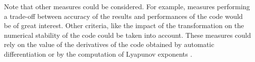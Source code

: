 \documentclass[main.tex]{subfiles}
\begin{document}
Note that other measures could be considered. For example, measures performing a trade-off between accuracy of the
results and performances of the code would be of great interest. Other criteria, like the impact of the transformation
on the numerical stability of the code could be taken into account. These measures could rely on the value
of the derivatives of the code obtained by automatic differentiation \cite{} or by the computation of Lyapunov exponents \cite{}.




\end{document}
